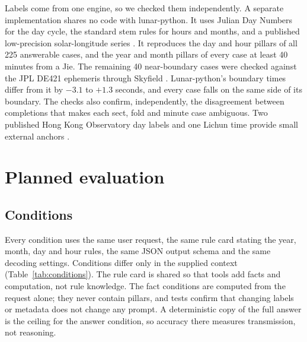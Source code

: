 \documentclass[12pt,letterpaper]{article}
\begin{document}
Labels come from one engine, so we checked them independently. A separate implementation shares no code with lunar-python. It uses Julian Day Numbers for the day cycle, the standard stem rules for hours and months, and a published low-precision solar-longitude series \citep{meeus}. It reproduces the day and hour pillars of all 225 answerable cases, and the year and month pillars of every case at least 40 minutes from a Jie. The remaining 40 near-boundary cases were checked against the JPL DE421 ephemeris through Skyfield \citep{skyfield}. Lunar-python's boundary times differ from it by $-3.1$ to $+1.3$ seconds, and every case falls on the same side of its boundary. The checks also confirm, independently, the disagreement between completions that makes each sect, fold and minute case ambiguous. Two published Hong Kong Observatory day labels and one Lichun time provide small external anchors \citep{hko2025}.

\section{Planned evaluation}

\subsection{Conditions}

Every condition uses the same user request, the same rule card stating the year, month, day and hour rules, the same JSON output schema and the same decoding settings. Conditions differ only in the supplied context (Table~\ref{tab:conditions}). The rule card is shared so that tools add facts and computation, not rule knowledge. The fact conditions are computed from the request alone; they never contain pillars, and tests confirm that changing labels or metadata does not change any prompt. A deterministic copy of the full answer is the ceiling for the answer condition, so accuracy there measures transmission, not reasoning.
\end{document}
